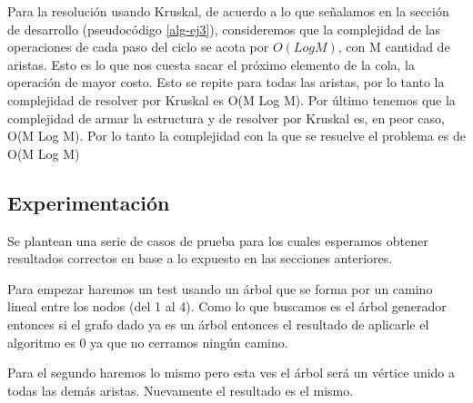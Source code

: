 Para la resolución usando Kruskal, de acuerdo a lo que señalamos en la sección de desarrollo (pseudocódigo \ref{alg-ej3}), consideremos que la complejidad de las operaciones de cada paso del ciclo se acota por $O(Log M)$, con M cantidad de aristas. Esto es lo que nos cuesta sacar el próximo elemento de la cola, la operación de mayor costo. Esto se repite para todas
las aristas, por lo tanto la complejidad de resolver por Kruskal es O(M Log M). Por último tenemos que la complejidad de armar la estructura y de resolver por Kruskal es, en peor caso, O(M Log M). Por lo tanto la complejidad con la que se resuelve el problema es de O(M Log M)



\subsection{Experimentación}

Se plantean una serie de casos de prueba para los cuales esperamos obtener resultados correctos en base a lo expuesto en las secciones anteriores.

Para empezar haremos un test usando un árbol que se forma por un camino lineal entre los nodos (del 1 al 4). Como lo que buscamos es el árbol generador entonces si el grafo
dado ya es un árbol entonces el resultado de aplicarle el algoritmo es 0 ya que no cerramos ningún camino.




Para el segundo haremos lo mismo pero esta ves el árbol será un vértice unido a todas las demás aristas. Nuevamente el resultado es el mismo.


